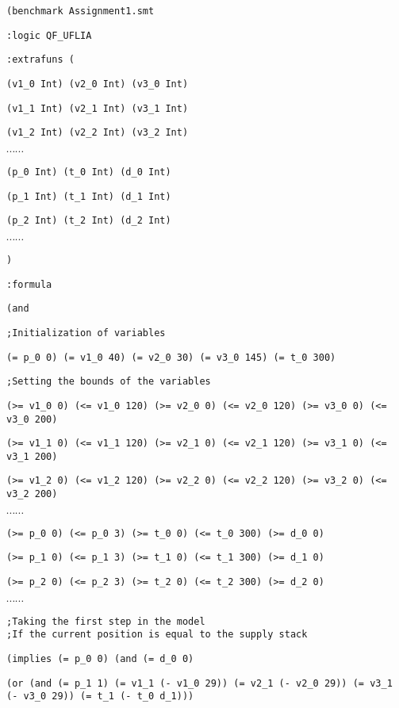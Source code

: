 \documentclass[a4paper]{article}
\begin{document}
{\footnotesize

{\tt (benchmark Assignment1.smt}

{\tt :logic QF\_UFLIA}

{\tt :extrafuns (}

{\tt (v1\_0 Int) (v2\_0 Int) (v3\_0 Int) }

{\tt (v1\_1 Int) (v2\_1 Int) (v3\_1 Int) }

{\tt (v1\_2 Int) (v2\_2 Int) (v3\_2 Int) }

$\cdots \cdots$

{\tt (p\_0 Int) (t\_0 Int) (d\_0 Int) }

{\tt (p\_1 Int) (t\_1 Int) (d\_1 Int) }

{\tt (p\_2 Int) (t\_2 Int) (d\_2 Int) }

$\cdots \cdots$

{\tt )}

{\tt :formula}

{\tt   (and}

{\tt ;Initialization of variables }

{\tt (= p\_0 0) (= v1\_0 40) (= v2\_0 30) (= v3\_0 145) (= t\_0 300) }

{\tt ;Setting the bounds of the variables }

{\tt (>= v1\_0 0) (<= v1\_0 120) (>= v2\_0 0) (<= v2\_0 120) (>= v3\_0 0) (<= v3\_0 200) }

{\tt (>= v1\_1 0) (<= v1\_1 120) (>= v2\_1 0) (<= v2\_1 120) (>= v3\_1 0) (<= v3\_1 200) }

{\tt (>= v1\_2 0) (<= v1\_2 120) (>= v2\_2 0) (<= v2\_2 120) (>= v3\_2 0) (<= v3\_2 200) }

$\cdots \cdots$

{\tt (>= p\_0 0) (<= p\_0 3) (>= t\_0 0) (<= t\_0 300) (>= d\_0 0) }

{\tt (>= p\_1 0) (<= p\_1 3) (>= t\_1 0) (<= t\_1 300) (>= d\_1 0) }

{\tt (>= p\_2 0) (<= p\_2 3) (>= t\_2 0) (<= t\_2 300) (>= d\_2 0) }

$\cdots \cdots$

{\tt ;Taking the first step in the model }\\

{\tt ;If the current position is equal to the supply stack }

{\tt (implies (= p\_0 0) (and (= d\_0 0) }

{\tt          (or (and (= p\_1 1) (= v1\_1 (- v1\_0 29)) (= v2\_1 (- v2\_0 29)) (= v3\_1 (- v3\_0 29)) (= t\_1 (- t\_0 d\_1))) }

}
\end{document}
